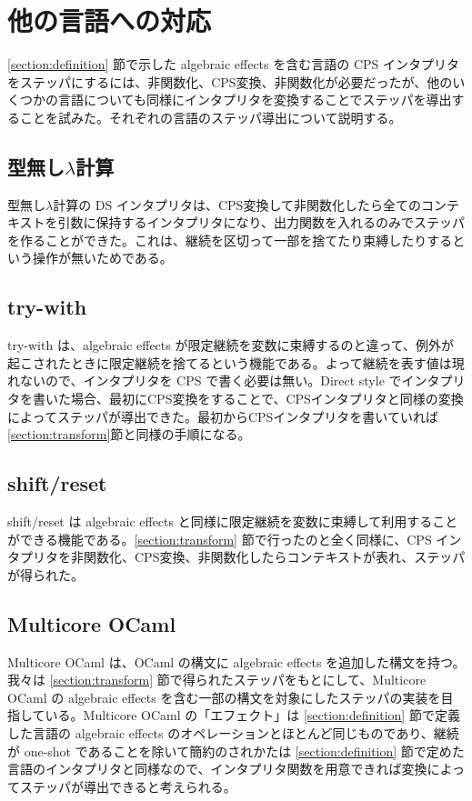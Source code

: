 \section{他の言語への対応}
\label{section:languages}

\ref{section:definition} 節で示した algebraic effects を含む言語の CPS インタプリタをステッパにするには、非関数化、CPS変換、非関数化が必要だったが、他のいくつかの言語についても同様にインタプリタを変換することでステッパを導出することを試みた。それぞれの言語のステッパ導出について説明する。


\subsection{型無し$\lambda$計算}
\label{subsection:lambda}

型無し$\lambda$計算の DS インタプリタは、CPS変換して非関数化したら全てのコンテキストを引数に保持するインタプリタになり、出力関数を入れるのみでステッパを作ることができた。これは、継続を区切って一部を捨てたり束縛したりするという操作が無いためである。


\subsection{try-with}
\label{subsection:try_with}

try-with は、algebraic effects が限定継続を変数に束縛するのと違って、例外が起こされたときに限定継続を捨てるという機能である。よって継続を表す値は現れないので、インタプリタを CPS で書く必要は無い。Direct style でインタプリタを書いた場合、最初にCPS変換をすることで、CPSインタプリタと同様の変換によってステッパが導出できた。最初からCPSインタプリタを書いていれば \ref{section:transform}節と同様の手順になる。


\subsection{shift/reset}
\label{subsection:shift/reset}

shift/reset は algebraic effects と同様に限定継続を変数に束縛して利用することができる機能である。\ref{section:transform} 節で行ったのと全く同様に、CPS インタプリタを非関数化、CPS変換、非関数化したらコンテキストが表れ、ステッパが得られた。


\subsection{Multicore OCaml}
\label{subsection:multicore_ocaml}

Multicore OCaml は、OCaml の構文に algebraic effects を追加した構文を持つ。我々は \ref{section:transform} 節で得られたステッパをもとにして、Multicore OCaml の algebraic effects を含む一部の構文を対象にしたステッパの実装を目指している。Multicore OCaml の「エフェクト」は \ref{section:definition} 節で定義した言語の algebraic effects のオペレーションとほとんど同じものであり、継続が one-shot であることを除いて簡約のされかたは \ref{section:definition} 節で定めた言語のインタプリタと同様なので、インタプリタ関数を用意できれば変換によってステッパが導出できると考えられる。
